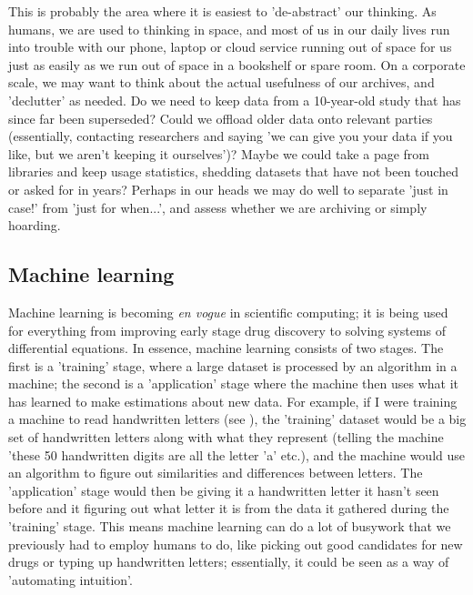 \documentclass{article}
\begin{document}
This is probably the area where it is easiest to 'de-abstract' our thinking. As humans, we are used to thinking in space, and most of us in our daily lives run into trouble with our phone, laptop or cloud service running out of space for us just as easily as we run out of space in a bookshelf or spare room. On a corporate scale, we may want to think about the actual usefulness of our archives, and 'declutter' as needed. Do we need to keep data from a 10-year-old study that has since far been superseded? Could we offload older data onto relevant parties (essentially, contacting researchers and saying 'we can give you your data if you like, but we aren't keeping it ourselves')? Maybe we could take a page from libraries and keep usage statistics, shedding datasets that have not been touched or asked for in years? Perhaps in our heads we may do well to separate 'just in case!' from 'just for when...', and assess whether we are archiving or simply hoarding.


\subsection{Machine learning}
Machine learning is becoming \textit{en vogue} in scientific computing; it is being used for everything from improving early stage drug discovery \citep{imrie2021generating} to solving systems of differential equations. \citep{bhattacharya2020model} In essence, machine learning consists of two stages. The first is a 'training' stage, where a large dataset is processed by an algorithm in a machine; the second is a 'application' stage where the machine then uses what it has learned to make estimations about new data. For example, if I were training a machine to read handwritten letters (see \citet{deng2012mnist}), the 'training' dataset would be a big set of handwritten letters along with what they represent (telling the machine 'these 50 handwritten digits are all the letter 'a' etc.), and the machine would use an algorithm to figure out similarities and differences between letters. The 'application' stage would then be giving it a handwritten letter it hasn't seen before and it figuring out what letter it is from the data it gathered during the 'training' stage. This means machine learning can do a lot of busywork that we previously had to employ humans to do, like picking out good candidates for new drugs or typing up handwritten letters; essentially, it could be seen as a way of 'automating intuition'. \newline
\end{document}
